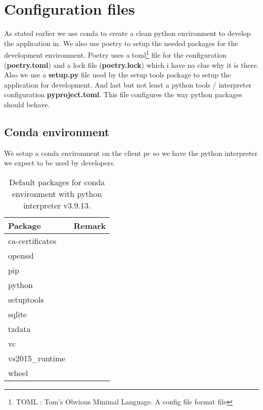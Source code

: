 \section{Configuration files}
As stated earlier we use conda to create a clean python environment to develop the \dfastmi application in. We also use poetry to setup the needed packages for the development environment. Poetry uses a toml\footnote{TOML : Tom's Obvious Minimal Language. A config file format file} file for the configuration (\textbf{poetry.toml}) and a lock file (\textbf{poetry.lock}) which i have no clue why it is there. Also we use a \textbf{setup.py} file used by the setup tools package to setup the application for development. And last but not least a python tools / interpreter configuration \textbf{pyproject.toml}. This file configures the way python packages should behave.

\subsection{Conda environment}
We setup a conda environment on the client pc so we have the python interpreter we expect to be used by developers.
\begin{table}[]
	\caption{Default packages for conda environment with python interpreter v3.9.13.}
	\begin{tabular}{|l|l|}
		\hline
		\textbf{Package}    & \textbf{Remark} \\ \hline
		ca-certificates     &                 \\ \hline
		openssl             &                 \\ \hline
		pip                 &                 \\ \hline
		python              &                 \\ \hline
		setuptools          &                 \\ \hline
		sqlite              &                 \\ \hline
		tzdata              &                 \\ \hline
		vc                  &                 \\ \hline
		vs2015\_runtime     &                 \\ \hline
		wheel               &                 \\ \hline
	\end{tabular}
\end{table}

